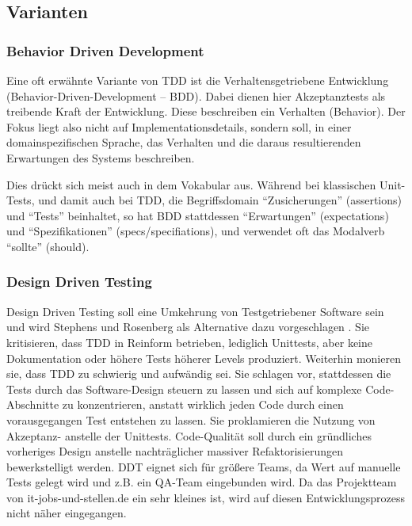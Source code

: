 \subsection{Varianten}



  \subsubsection{Behavior Driven Development}
  
  Eine oft erwähnte Variante von TDD ist die Verhaltensgetriebene Entwicklung (Behavior-Driven-Development -- BDD). Dabei dienen hier Akzeptanztests als treibende Kraft der Entwicklung. Diese beschreiben ein Verhalten (Behavior). Der Fokus liegt also nicht auf Implementationsdetails, sondern soll, in einer domainspezifischen Sprache, das Verhalten und die daraus resultierenden Erwartungen des Systems beschreiben.
  
  Dies drückt sich meist auch in dem Vokabular aus. Während bei klassischen Unit-Tests, und damit auch bei TDD, die Begriffsdomain  "`Zusicherungen"' (assertions) und "`Tests"' beinhaltet, so hat BDD stattdessen "`Erwartungen"' (expectations) und "`Spezifikationen"' (specs/specifiations), und verwendet oft das Modalverb "`sollte"' (should).
  
 \subsubsection{Design Driven Testing}
  Design Driven Testing soll eine Umkehrung von Testgetriebener Software sein und wird Stephens und Rosenberg als Alternative dazu vorgeschlagen \citep{stephens_design_2010}. Sie kritisieren, dass TDD in Reinform betrieben, lediglich Unittests, aber keine Dokumentation oder höhere Tests höherer Levels produziert. Weiterhin monieren sie, dass TDD zu schwierig und aufwändig sei. Sie schlagen vor, stattdessen die Tests durch das Software-Design steuern zu lassen und sich auf komplexe Code-Abschnitte zu konzentrieren, anstatt wirklich jeden Code durch einen vorausgegangen Test entstehen zu lassen. Sie proklamieren die Nutzung von Akzeptanz- anstelle der Unittests. Code-Qualität soll durch ein gründliches vorheriges Design anstelle nachträglicher massiver Refaktorisierungen bewerkstelligt werden.
  DDT eignet sich für größere Teams, da Wert auf manuelle Tests gelegt wird und z.B. ein QA-Team eingebunden wird. Da das Projektteam von it-jobs-und-stellen.de ein sehr kleines ist, wird auf diesen Entwicklungsprozess nicht näher eingegangen.